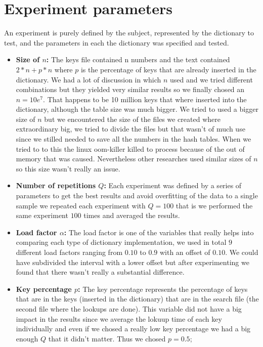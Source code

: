 \documentclass{article}
\begin{document}
    \section{Experiment parameters}
    An experiment is purely defined by the subject, represented by the dictionary to test, and the parameters in each the dictionary was specified and tested. 
    \begin{itemize}
    \item \textbf{Size of $n$:}
		   The keys file contained n numbers and the text contained $2 * n + p * n$ where $p$ is the percentage of keys that are already inserted in the dictionary. 
		   We had a lot of discussion in which $n$ used and we tried different combinations but they yielded very similar results so we finally chosed an $n=10e^7$. 
		   That happens to be 10 million keys that where inserted into the dictionary, although the table size was much bigger. We tried to used a bigger size of $n$
		   but we encountered the size of the files we created where extraordinary big, we tried to divide the files but that wasn't of much use since we stilled needed to 
		   save all the numbers in the hash tables. When we tried to to this the linux oom-killer killed to process because of the out of memory that was caused. Nevertheless 
		   other researches \cite{ARTICLE:2} used similar sizes of $n$ so this size wasn't really an issue. 
    \item \textbf{Number of repetitions $Q$:}
    		   Each experiment was defined by a series of parameters to get the best results and avoid overfitting of the data to a single sample we 
    		   repeated each experiment with $Q=100$ that is we performed the same experiment $100$ times and averaged the results. 
   
   \item \textbf{Load factor $\alpha$:}
   		   The load factor is one of the variables that really helps into comparing each type of dictionary implementation, we used in total 
   		   $9$ different load factors ranging from $0.10$ to $0.9$ with an offset of $0.10$. We could have subdivided the interval with a lower 
   		   offset but after experimenting we found that there wasn't really a substantial difference. 
   		   
   \item \textbf{Key percentage $p$:}
   		  The key percentage represents the percentage of keys that are in the keys (inserted in the dictionary) that are in the search file (the second file where the lookups are done). 
   		  This variable did not have a big impact in the results since we average the lokuup time of each key individually and even if we chosed a really low key percentage we had a big enough 
   		  $Q$ that it didn't matter. Thus we chosed $p=0.5$;
   		  

\end{itemize}
\end{document}
